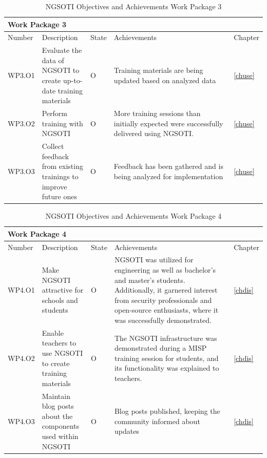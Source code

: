 \begin{table}
    \begin{tabular}{ |p{0.07\linewidth}  |p{0.2\linewidth}| p{0.04\linewidth}| p{0.62\linewidth}|  p{0.07\linewidth}| }
    \hline
    \multicolumn{5}{|p{0.97\linewidth}|}{Work Package 3} \\
    \hline
    Number & Description & State & Achievements & Chapter \\
    \hline
    WP3.O1 & Evaluate the data of NGSOTI to create up-to-date training materials & O & Training materials are being updated based on analyzed data & \ref{chuse}\\
    \hline
    WP3.O2 & Perform training with NGSOTI & O &  More training sessions than initially expected were successfully delivered using NGSOTI. &  \ref{chuse}\\
    \hline
    WP3.O3 & Collect feedback from existing trainings to improve future ones & O & Feedback has been gathered and is being analyzed for implementation & \ref{chuse}\\
    \hline
    \end{tabular}
    \caption{NGSOTI Objectives and Achievements Work Package 3}
\label{oa3}
\end{table}


\begin{table}
        \begin{tabular}{ |p{0.07\linewidth}  |p{0.2\linewidth}| p{0.04\linewidth}| p{0.62\linewidth}|  p{0.07\linewidth}| }
        \hline
        \multicolumn{5}{|p{0.97\linewidth}|}{Work Package 4} \\
        \hline
        Number & Description & State & Achievements & Chapter \\
        \hline
        WP4.O1 & Make NGSOTI attractive for schools and students & O &NGSOTI was
        utilized for engineering as well as bachelor’s and master’s students.
        Additionally, it garnered interest from security professionals and open-source
        enthusiasts, where it was successfully demonstrated.  & \ref{chdis} \\
        \hline
        WP4.O2 & Enable teachers to use NGSOTI to create training materials & O &
        The NGSOTI infrastructure was demonstrated during a MISP training session for
        students, and its functionality was explained to teachers. & \ref{chdis} \\
        \hline
        WP4.O3 & Maintain blog posts about the components used within NGSOTI & O &
        Blog posts published, keeping the community informed about updates &  \ref{chdis}\\
        \hline
        \end{tabular}
    \caption{NGSOTI Objectives and Achievements Work Package 4}
    \label{oa4}
\end{table}





